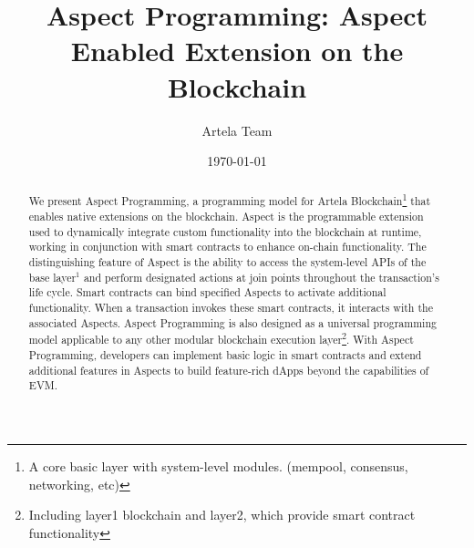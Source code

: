 \documentclass{article}
\begin{document}
\title{Aspect Programming: Aspect Enabled Extension on the Blockchain}
\author{Artela Team}
\date{\today}


\maketitle

\begin{abstract}
    We present Aspect Programming, a programming model for Artela Blockchain\footnote{A core basic layer with system-level modules. (mempool, consensus, networking, etc)} that enables native extensions on the blockchain. Aspect is the programmable extension used to dynamically integrate custom functionality into the blockchain at runtime, working in conjunction with smart contracts to enhance on-chain functionality. The distinguishing feature of Aspect is the ability to access the system-level APIs of the base layer$^1$ and perform designated actions at join points throughout the transaction's life cycle. Smart contracts can bind specified Aspects to activate additional functionality. When a transaction invokes these smart contracts, it interacts with the associated Aspects. Aspect Programming is also designed as a universal programming model applicable to any other modular blockchain execution layer\footnote{Including layer1 blockchain and layer2, which provide smart contract functionality}. With Aspect Programming, developers can implement basic logic in smart contracts and extend additional features in Aspects to build feature-rich dApps beyond the capabilities of EVM.
\end{abstract}

\newpage
\tableofcontents
\newpage









\newpage




\end{document}
